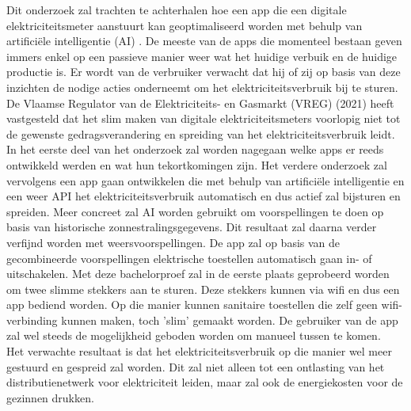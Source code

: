 Dit onderzoek zal trachten te achterhalen hoe een app die een digitale elektriciteitsmeter aanstuurt kan geoptimaliseerd worden met behulp van artificiële intelligentie (AI) . De meeste van de apps die momenteel bestaan geven immers enkel op een passieve manier weer wat het huidige verbuik en de huidige productie is.  Er wordt van de verbruiker verwacht dat hij of zij op basis van deze inzichten de nodige acties onderneemt om het elektriciteitsverbruik bij te sturen. De Vlaamse Regulator van de Elektriciteits- en Gasmarkt (VREG) (2021) heeft vastgesteld dat het slim maken van digitale elektriciteitsmeters voorlopig niet tot de gewenste gedragsverandering en spreiding van het elektriciteitsverbruik leidt. \\

In het eerste deel van het onderzoek zal worden nagegaan welke apps er reeds ontwikkeld werden en wat hun tekortkomingen zijn. Het verdere onderzoek zal vervolgens een app gaan ontwikkelen die met behulp van artificiële intelligentie en een weer API het elektriciteitsverbruik automatisch en dus actief zal bijsturen en spreiden. Meer concreet zal AI worden gebruikt om voorspellingen te doen op basis van historische zonnestralingsgegevens. Dit resultaat zal daarna verder verfijnd worden met weersvoorspellingen. De app zal op basis van de gecombineerde voorspellingen elektrische toestellen automatisch gaan in- of uitschakelen. Met deze bachelorproef zal in de eerste plaats geprobeerd worden om twee slimme stekkers aan te sturen. Deze stekkers kunnen via wifi en dus een app bediend worden. Op die manier kunnen sanitaire toestellen die zelf geen wifi-verbinding kunnen maken, toch 'slim' gemaakt worden. De gebruiker van de app zal wel steeds de mogelijkheid geboden worden om manueel tussen te komen. \\

Het verwachte resultaat is dat het elektriciteitsverbruik op die manier wel meer gestuurd en gespreid zal worden. Dit zal niet alleen tot een ontlasting van het distributienetwerk voor elektriciteit leiden, maar zal ook de energiekosten voor de gezinnen drukken.
